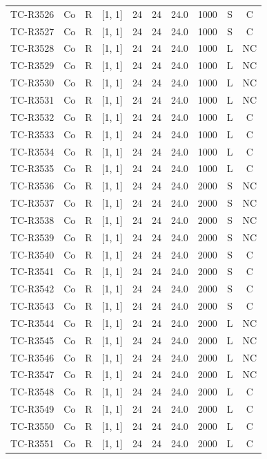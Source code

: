 \begin{longtable}{lccccccccc}
TC-R3526 & Co & R & [1, 1] & 24 & 24 & 24.0 & 1000 & S & C \\
TC-R3527 & Co & R & [1, 1] & 24 & 24 & 24.0 & 1000 & S & C \\
TC-R3528 & Co & R & [1, 1] & 24 & 24 & 24.0 & 1000 & L & NC \\
TC-R3529 & Co & R & [1, 1] & 24 & 24 & 24.0 & 1000 & L & NC \\
TC-R3530 & Co & R & [1, 1] & 24 & 24 & 24.0 & 1000 & L & NC \\
TC-R3531 & Co & R & [1, 1] & 24 & 24 & 24.0 & 1000 & L & NC \\
TC-R3532 & Co & R & [1, 1] & 24 & 24 & 24.0 & 1000 & L & C \\
TC-R3533 & Co & R & [1, 1] & 24 & 24 & 24.0 & 1000 & L & C \\
TC-R3534 & Co & R & [1, 1] & 24 & 24 & 24.0 & 1000 & L & C \\
TC-R3535 & Co & R & [1, 1] & 24 & 24 & 24.0 & 1000 & L & C \\
TC-R3536 & Co & R & [1, 1] & 24 & 24 & 24.0 & 2000 & S & NC \\
TC-R3537 & Co & R & [1, 1] & 24 & 24 & 24.0 & 2000 & S & NC \\
TC-R3538 & Co & R & [1, 1] & 24 & 24 & 24.0 & 2000 & S & NC \\
TC-R3539 & Co & R & [1, 1] & 24 & 24 & 24.0 & 2000 & S & NC \\
TC-R3540 & Co & R & [1, 1] & 24 & 24 & 24.0 & 2000 & S & C \\
TC-R3541 & Co & R & [1, 1] & 24 & 24 & 24.0 & 2000 & S & C \\
TC-R3542 & Co & R & [1, 1] & 24 & 24 & 24.0 & 2000 & S & C \\
TC-R3543 & Co & R & [1, 1] & 24 & 24 & 24.0 & 2000 & S & C \\
TC-R3544 & Co & R & [1, 1] & 24 & 24 & 24.0 & 2000 & L & NC \\
TC-R3545 & Co & R & [1, 1] & 24 & 24 & 24.0 & 2000 & L & NC \\
TC-R3546 & Co & R & [1, 1] & 24 & 24 & 24.0 & 2000 & L & NC \\
TC-R3547 & Co & R & [1, 1] & 24 & 24 & 24.0 & 2000 & L & NC \\
TC-R3548 & Co & R & [1, 1] & 24 & 24 & 24.0 & 2000 & L & C \\
TC-R3549 & Co & R & [1, 1] & 24 & 24 & 24.0 & 2000 & L & C \\
TC-R3550 & Co & R & [1, 1] & 24 & 24 & 24.0 & 2000 & L & C \\
TC-R3551 & Co & R & [1, 1] & 24 & 24 & 24.0 & 2000 & L & C \\

\end{longtable}
